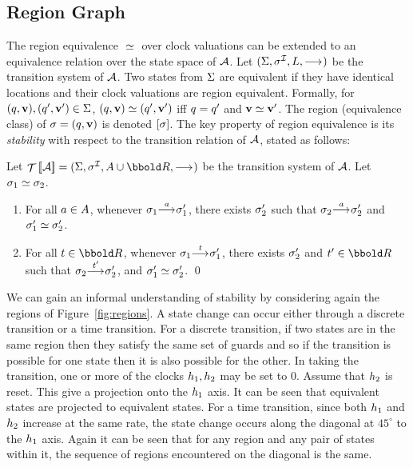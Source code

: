 { \subsection{Region Graph}\label{ss:mscregiongraph}
The region equivalence ${}\simeq{}$ over clock valuations can be
extended to an equivalence relation over the state space of $\AA$. Let
$(\States,\Init,\Labels,\TRel)$ be the transition system of $\AA$. Two
states from $\Sigma$ are equivalent if they have identical locations
and their clock valuations are region equivalent. Formally, for
$(q,\mathbf{v}), (q',\mathbf{v}') \in \Sigma$, $(q,\mathbf{v})
\simeq (q',\mathbf{v}')$ iff $q = q'$ and $\mathbf{v} \simeq
\mathbf{v}'$. The region (equivalence class) of $\sigma =
(q,\mathbf{v})$ is denoted $[\sigma]$. The key property of
region equivalence is its \emph{stability} with respect to the 
transition relation of $\AA$, stated as follows:
\begin{proposition}
Let $\TSys{\AA} = (\States,\Init,\Actions \cup \Time, \TRel)$ be the
transition system of $\AA$. Let $\sigma_1 \simeq \sigma_2$.
\begin{enumerate}
\item For all $a \in A$, whenever $\sigma_1 {\mathrel{{\stackrel{a}{\longrightarrow_{\mathrm{{}}}}}}} \sigma'_1$,
there exists $\sigma'_2$ such that $\sigma_2 {\mathrel{{\stackrel{a}{\longrightarrow_{\mathrm{{}}}}}}} \sigma'_2$ and
$\sigma'_1 \simeq \sigma'_2$.
\item For all $t \in \Time$, whenever $\sigma_1 {\mathrel{{\stackrel{t}{\longrightarrow_{\mathrm{{}}}}}}} \sigma'_1$,
there exists $\sigma'_2$ and $t' \in \Time$ such that 
$\sigma_2 {\mathrel{{\stackrel{t'}{\longrightarrow_{\mathrm{{}}}}}}} \sigma'_2$, and $\sigma'_1 \simeq \sigma'_2$.
\qed
\end{enumerate}
\end{proposition}
We can gain an informal understanding of stability by considering
again the regions of Figure~\ref{fig:regions}. A state change can
occur either through a discrete transition or a time transition. For a
discrete transition, if two states are in the same region then they
satisfy the same set of guards and so if the transition is possible
for one state then it is also possible for the other. In taking the
transition, one or more of the clocks $h_1, h_2$ may be set
to $0$. Assume that $h_2$ is reset. This give a projection onto
the $h_1$ axis.  It can be seen that equivalent states are
projected to equivalent states.  For a time transition, since both $h_1$
and $h_2$ increase at the same rate, the state change occurs along the
diagonal at $45^\circ$ to the $h_1$ axis. Again it can be seen that for
any region and any pair of states within it, the sequence of regions 
encountered on the diagonal is the same.

}
